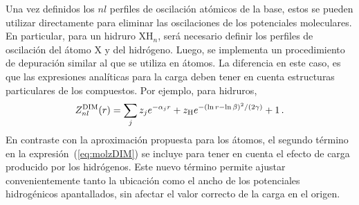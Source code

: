 Una vez definidos los $nl$ perfiles de oscilación atómicos de la base, 
estos se pueden utilizar directamente para eliminar las oscilaciones de 
los potenciales moleculares. En particular, para un hidruro XH$_n$, será 
necesario definir los perfiles de oscilación del átomo X y del 
hidrógeno. Luego, se implementa un procedimiento de depuración similar 
al que se utiliza en átomos. La diferencia en este caso, es que las 
expresiones analíticas para la carga deben tener en cuenta estructuras 
particulares de los compuestos. Por ejemplo, para hidruros,
\begin{eqnarray}
 Z_{nl}^{\mathrm{DIM}}(r) = \sum_j z_j e^{-\alpha_j r} 
 + z_{\mbox{\scriptsize H}} e^{-(\ln r - \ln \beta)^2/(2\gamma)} 
 + 1\,.
 \label{eq:molzDIM}
\end{eqnarray}
En contraste con la aproximación propuesta para los átomos, el segundo 
término en la expresión~(\ref{eq:molzDIM}) se incluye para tener en 
cuenta el efecto de carga producido por los hidrógenos. Este nuevo 
término permite ajustar convenientemente tanto la ubicación como el 
ancho de los potenciales hidrogénicos apantallados, sin afectar el valor 
correcto de la carga en el origen.

